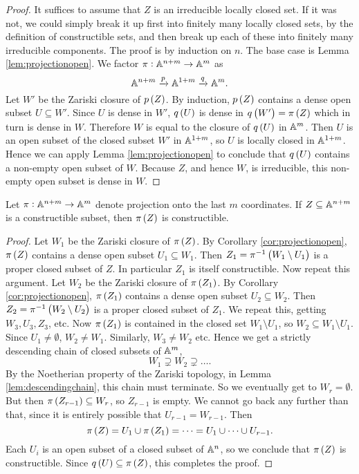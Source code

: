 \pagebreak

\begin{proof}
It suffices to assume that $ Z $ is an irreducible locally closed set. If it was not, we could simply break it up first into finitely many locally closed sets, by the definition of constructible sets, and then break up each of these into finitely many irreducible components. The proof is by induction on $ n $. The base case is Lemma \ref{lem:projectionopen}. We factor $ \pi : \AA^{n + m} \to \AA^m $ as
$$ \AA^{n + m} \xrightarrow{p} \AA^{1 + m} \xrightarrow{q} \AA^m. $$
Let $ W' $ be the Zariski closure of $ p\br{Z} $. By induction, $ p\br{Z} $ contains a dense open subset $ U \subseteq W' $. Since $ U $ is dense in $ W' $, $ q\br{U} $ is dense in $ q\br{W'} = \pi\br{Z} $ which in turn is dense in $ W $. Therefore $ W $ is equal to the closure of $ q\br{U} $ in $ \AA^m $. Then $ U $ is an open subset of the closed subset $ W' $ in $ \AA^{1 + m} $, so $ U $ is locally closed in $ \AA^{1 + m} $. Hence we can apply Lemma \ref{lem:projectionopen} to conclude that $ q\br{U} $ contains a non-empty open subset of $ W $. Because $ Z $, and hence $ W $, is irreducible, this non-empty open subset is dense in $ W $.
\end{proof}

\begin{lemma}
\label{lem:projectionconstructible}
Let $ \pi : \AA^{n + m} \to \AA^m $ denote projection onto the last $ m $ coordinates. If $ Z \subseteq \AA^{n + m} $ is a constructible subset, then $ \pi\br{Z} $ is constructible.
\end{lemma}

\begin{proof}
Let $ W_1 $ be the Zariski closure of $ \pi\br{Z} $. By Corollary \ref{cor:projectionopen}, $ \pi\br{Z} $ contains a dense open subset $ U_1 \subseteq W_1 $. Then $ Z_1 = \pi^{-1}\br{W_1 \setminus U_1} $ is a proper closed subset of $ Z $. In particular $ Z_1 $ is itself constructible. Now repeat this argument. Let $ W_2 $ be the Zariski closure of $ \pi\br{Z_1} $. By Corollary \ref{cor:projectionopen}, $ \pi\br{Z_1} $ contains a dense open subset $ U_2 \subseteq W_2 $. Then $ Z_2 = \pi^{-1}\br{W_2 \setminus U_2} $ is a proper closed subset of $ Z_1 $. We repeat this, getting $ W_3, U_3, Z_3 $, etc. Now $ \pi\br{Z_1} $ is contained in the closed set $ W_1 \setminus U_1 $, so $ W_2 \subseteq W_1 \setminus U_1 $. Since $ U_1 \ne \emptyset $, $ W_2 \ne W_1 $. Similarly, $ W_3 \ne W_2 $ etc. Hence we get a strictly descending chain of closed subsets of $ \AA^m $,
$$ W_1 \supsetneq W_2 \supsetneq \dots. $$
By the Noetherian property of the Zariski topology, in Lemma \ref{lem:descendingchain}, this chain must terminate. So we eventually get to $ W_r = \emptyset $. But then $ \pi\br{Z_{r - 1}} \subseteq W_r $, so $ Z_{r - 1} $ is empty. We cannot go back any further than that, since it is entirely possible that $ U_{r - 1} = W_{r - 1} $. Then
$$ \pi\br{Z} = U_1 \cup \pi\br{Z_1} = \dots = U_1 \cup \dots \cup U_{r - 1}. $$
Each $ U_i $ is an open subset of a closed subset of $ \AA^n $, so we conclude that $ \pi\br{Z} $ is constructible. Since $ q\br{U} \subseteq \pi\br{Z} $, this completes the proof.
\end{proof}

